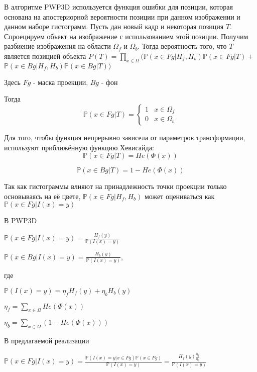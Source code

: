В алгоритме PWP3D \cite{PWP3D} используется функция ошибки для позиции, которая
основана на апостериорной вероятности позиции при данном изображении и данном
наборе гистограмм.
Пусть дан новый кадр и некоторая позиция $T$.
Спроецируем объект на изображение с использованием этой позиции.
Получим разбиение изображения на области $\Omega_f$ и $\Omega_b$.
Тогда вероятность того, что $T$
является позицией объекта
$
    P(T) = \prod\limits_{x \in \Omega}(\mathbb{P}(x \in Fg | H_f, H_b)\mathbb{P}(x \in Fg | T) +$ $\mathbb{P}(x \in Bg|H_f, H_b)\mathbb{P}(x \in Bg | T))
$


Здесь $Fg$ - маска проекции, $Bg$ - фон

Тогда
\begin{equation*}
    \mathbb{P}(x \in Fg | T) = 
     \begin{cases}
       1 &x \in \Omega_f\\
       0 &x \in \Omega_b
     \end{cases}
\end{equation*}

Для того, чтобы функция непрерывно зависела от параметров трансформации,
используют приближённую функцию Хевисайда:
$$
    \mathbb{P}(x \in Fg | T) = He(\Phi(x))
$$ 

$$
    \mathbb{P}(x \in Bg | T) = 1 - He(\Phi(x))
$$

Так как гистограммы влияют на принадлежность точки проекции только основываясь
на её цвете,
$\mathbb{P}(x \in Fg | H_f, H_b)$
может оцениваться как
$\mathbb{P}(x \in Fg | I(x) = y)$

В PWP3D

$
    \mathbb{P}(x \in Fg | I(x) = y) = \frac{H_f(y)}{\mathbb{P}(I(x) = y)}
$

$
    \mathbb{P}(x \in Bg | I(x) = y) = \frac{H_b(y)}{\mathbb{P}(I(x) = y)}
$,

где

$
    \mathbb{P}(I(x) = y) = \eta_f H_f(y) + \eta_b H_b(y)
$

$
    \eta_f = \sum\limits_{x \in \Omega}He(\Phi(x))
$

$
    \eta_b = \sum\limits_{x \in \Omega}(1 - He(\Phi(x)))
$

В предлагаемой реализации

$
    \mathbb{P}(x \in Fg | I(x) = y) = \frac{\mathbb{P}(I(x) = y | x \in Fg) \mathbb{P}(x \in Fg)}{\mathbb{P}(I(x) = y)} = \frac{H_f(y)\frac{\eta_f}{\eta_b}}{\mathbb{P}(I(x) = y)}
$

